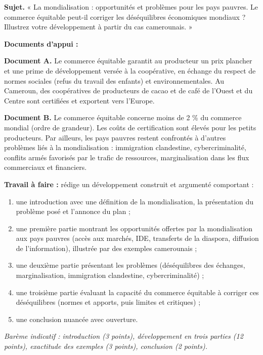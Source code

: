 \documentclass[11pt]{article}
\begin{document}
\begin{exercice}
\textbf{Sujet.} « La mondialisation : opportunités et problèmes pour les pays pauvres. Le commerce équitable peut-il corriger les déséquilibres économiques mondiaux ? Illustrez votre développement à partir du cas camerounais. »

\textbf{Documents d'appui :}

\textbf{Document A.} Le commerce équitable garantit au producteur un prix plancher et une prime de développement versée à la coopérative, en échange du respect de normes sociales (refus du travail des enfants) et environnementales. Au Cameroun, des coopératives de producteurs de cacao et de café de l'Ouest et du Centre sont certifiées et exportent vers l'Europe.

\textbf{Document B.} Le commerce équitable concerne moins de 2 \% du commerce mondial (ordre de grandeur). Les coûts de certification sont élevés pour les petits producteurs. Par ailleurs, les pays pauvres restent confrontés à d'autres problèmes liés à la mondialisation : immigration clandestine, cybercriminalité, conflits armés favorisés par le trafic de ressources, marginalisation dans les flux commerciaux et financiers.

\textbf{Travail à faire :} rédige un développement construit et argumenté comportant :
\begin{enumerate}
\item une introduction avec une définition de la mondialisation, la présentation du problème posé et l'annonce du plan ;
\item une première partie montrant les opportunités offertes par la mondialisation aux pays pauvres (accès aux marchés, IDE, transferts de la diaspora, diffusion de l'information), illustrée par des exemples camerounais ;
\item une deuxième partie présentant les problèmes (déséquilibres des échanges, marginalisation, immigration clandestine, cybercriminalité) ;
\item une troisième partie évaluant la capacité du commerce équitable à corriger ces déséquilibres (normes et apports, puis limites et critiques) ;
\item une conclusion nuancée avec ouverture.
\end{enumerate}
\emph{Barème indicatif : introduction (3 points), développement en trois parties (12 points), exactitude des exemples (3 points), conclusion (2 points).}
\end{exercice}
\end{document}
